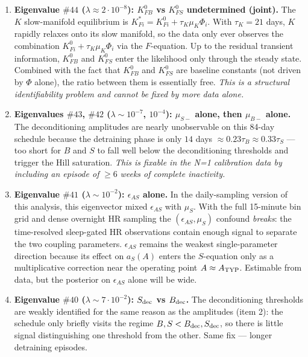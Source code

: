 \begin{enumerate}
  \item \textbf{Eigenvalue $\#44$ ($\lambda \approx 2\cdot 10^{-8}$): $K_{FB}^0$ vs $K_{FS}^0$ undetermined (joint).}
  The $K$ slow-manifold equilibrium is $K_{Fi}^* = K_{Fi}^0 + \tau_K \mu_K \Phi_i$. With $\tau_K = 21$ days, $K$ rapidly relaxes onto its slow manifold, so the data only ever observes the combination $K_{Fi}^0 + \tau_K \mu_K \Phi_i$ via the $F$-equation. Up to the residual transient information, $K_{FB}^0$ and $K_{FS}^0$ enter the likelihood only through the steady state. Combined with the fact that $K_{FB}^0$ and $K_{FS}^0$ are baseline constants (not driven by $\Phi$ alone), the ratio between them is essentially free. \emph{This is a structural identifiability problem and cannot be fixed by more data alone.}

  \item \textbf{Eigenvalues $\#43$, $\#42$ ($\lambda \sim 10^{-7}$, $10^{-4}$): $\mu_{S-}$ alone, then $\mu_{B-}$ alone.}
  The deconditioning amplitudes are nearly unobservable on this 84-day schedule because the detraining phase is only $14$ days $\approx 0.23 \tau_B \approx 0.33 \tau_S$ --- too short for $B$ and $S$ to fall well below the deconditioning thresholds and trigger the Hill saturation. \emph{This is fixable in the N=1 calibration data by including an episode of} $\ge 6$ \emph{weeks of complete inactivity.}

  \item \textbf{Eigenvalue $\#41$ ($\lambda \sim 10^{-2}$): $\epsilon_{AS}$ alone.}
  In the daily-sampling version of this analysis, this eigenvector mixed $\epsilon_{AS}$ with $\mu_S$. With the full 15-minute bin grid and dense overnight HR sampling the $(\epsilon_{AS}, \mu_S)$ confound \emph{breaks}: the time-resolved sleep-gated HR observations contain enough signal to separate the two coupling parameters. $\epsilon_{AS}$ remains the weakest single-parameter direction because its effect on $a_S(A)$ enters the $S$-equation only as a multiplicative correction near the operating point $A \approx A_{\rm TYP}$. Estimable from data, but the posterior on $\epsilon_{AS}$ alone will be wide.

  \item \textbf{Eigenvalue $\#40$ ($\lambda \sim 7 \cdot 10^{-2}$): $S_{\rm dec}$ vs $B_{\rm dec}$.}
  The deconditioning thresholds are weakly identified for the same reason as the amplitudes (item 2): the schedule only briefly visits the regime $B, S < B_{\rm dec}, S_{\rm dec}$, so there is little signal distinguishing one threshold from the other. Same fix --- longer detraining episodes.
\end{enumerate}

